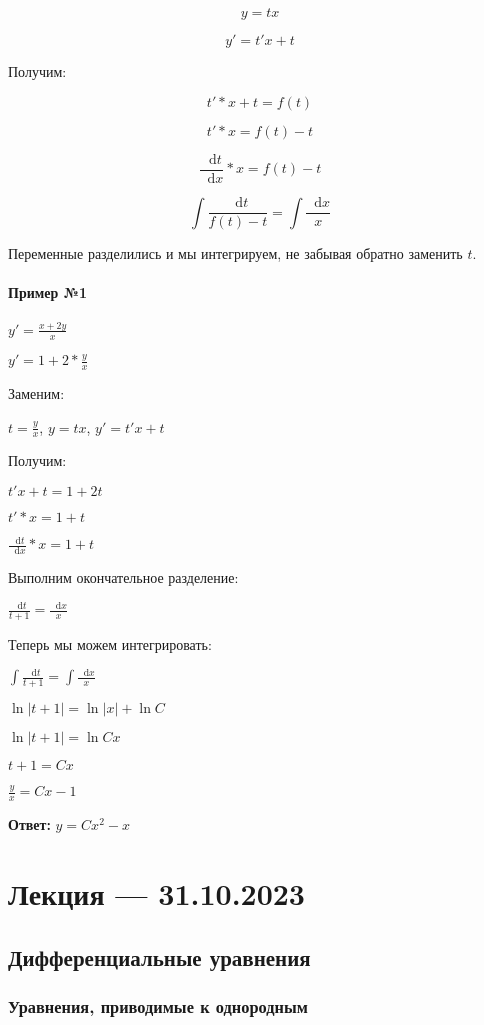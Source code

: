 \documentclass{article}
\newcommand*\diff{\mathop{}\!\mathrm{d}}
\begin{document}
$$y = tx$$

$$y' = t' x + t$$

Получим:

$$t' * x + t = f(t)$$

$$t' * x = f(t) - t$$

$$\frac{\diff t}{\diff x} * x = f(t) - t$$

$$\int \frac{\diff t}{f(t) - t} = \int \frac{\diff x}{x}$$

Переменные разделились и мы интегрируем, не забывая обратно заменить $t$.

\paragraph{Пример №1}

$y' = \frac{x + 2y}{x}$

$y' = 1 + 2 * \frac{y}{x}$

Заменим:

$t = \frac{y}{x}$, $y = tx$, $y' = t' x + t$

Получим:

$t'x + t = 1 + 2t$

$t' * x = 1 + t$

$\frac{\diff t}{\diff x} * x = 1 + t$

Выполним окончательное разделение:

$\frac{\diff t}{t + 1} = \frac{\diff x}{x}$

Теперь мы можем интегрировать:

$\int \frac{\diff t}{t + 1} = \int \frac{\diff x}{x}$

$\ln |t + 1| = \ln |x| + \ln C$

$\ln |t + 1| = \ln Cx$

$t + 1 = Cx$

$\frac{y}{x} = Cx - 1$

\textbf{Ответ:} $y = Cx^2 - x$

\pagebreak
\section{Лекция — 31.10.2023}

\subsection{Дифференциальные уравнения}

\subsubsection{Уравнения, приводимые к однородным}
\end{document}
